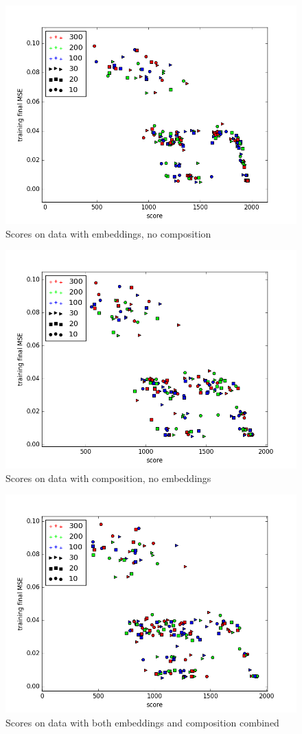 \begin{figure}
\centering
\includegraphics[width=.8\linewidth]{ext/figure_embed_arch.png}
\caption{Scores on data with embeddings, no composition}
\label{fig:embed_arch}
\end{figure}

\begin{figure}
\centering
\includegraphics[width=.8\linewidth]{ext/figure_comp_arch.png}
\caption{Scores on data with composition, no embeddings}
\label{fig:comp_arch}
\end{figure}

\begin{figure}
\centering
\includegraphics[width=.8\linewidth]{ext/figure_x_arch.png}
\caption{Scores on data with both embeddings and composition combined}
\label{fig:x_arch}
\end{figure}


